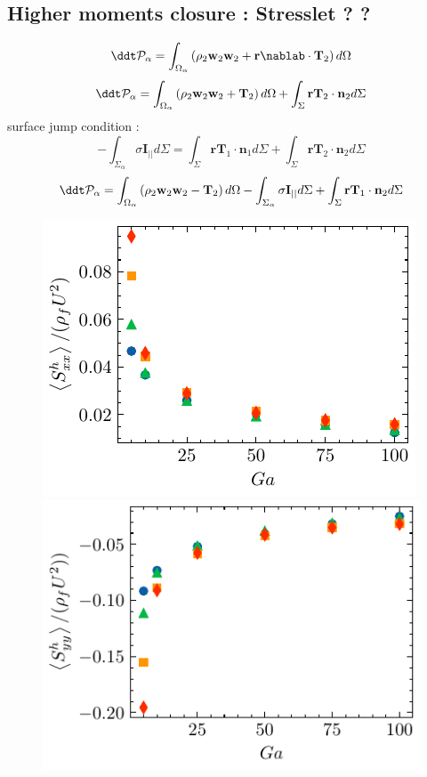 
\subsection{Higher moments closure : Stresslet ? ? }


\begin{equation}
    \ddt \mathcal{P}_\alpha
    = \int_{\Omega_\alpha} \left(
        \rho_2  \textbf{w}_2 \textbf{w}_2 
        + \textbf{r} \nablab \cdot \mathbf{T}_2
    \right) d\Omega
\end{equation}
\begin{equation}
    \ddt \mathcal{P}_\alpha
    = \int_{\Omega_\alpha} \left(
        \rho_2  \textbf{w}_2 \textbf{w}_2 
        + \mathbf{T}_2
    \right) d\Omega
+ \int_{\Sigma}\textbf{rT}_2 \cdot \textbf{n}_2 d\Sigma
\end{equation}
surface jump condition : 
\begin{equation}
    - \int_{\Sigma_\alpha} 
    \sigma \textbf{I}_{||}
d\Sigma
= \int_{\Sigma}\textbf{rT}_1 \cdot \textbf{n}_1 d\Sigma
+ \int_{\Sigma}\textbf{rT}_2 \cdot \textbf{n}_2 d\Sigma
\end{equation}
\begin{equation}
    \ddt \mathcal{P}_\alpha
    = \int_{\Omega_\alpha} \left(
        \rho_2  \textbf{w}_2 \textbf{w}_2 
        - \mathbf{T}_2
    \right) d\Omega
    - \int_{\Sigma_\alpha} 
        \sigma \textbf{I}_{||}
    d\Sigma
    + \int_{\Sigma}\textbf{rT}_1 \cdot \textbf{n}_2 d\Sigma
\end{equation}
\begin{figure}[h!]
    \centering
    \includegraphics[height=0.3\textwidth]{image/HOMOGENEOUS/fPA/Sxx.pdf}
    \includegraphics[height=0.3\textwidth]{image/HOMOGENEOUS/fPA/Syy.pdf}
\end{figure}
